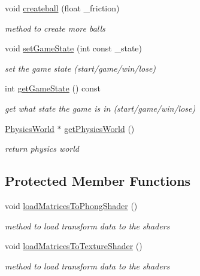\begin{DoxyCompactItemize}
void \hyperlink{classNGLDraw_a11a65720f14b3b58173c23daf8013e7c}{createball} (float \_\-friction)
\begin{DoxyCompactList}\small\item\em method to create more balls \item\end{DoxyCompactList}\item 
void \hyperlink{classNGLDraw_a79b107d9d00406530f7693159c6afdad}{setGameState} (int const \_\-state)
\begin{DoxyCompactList}\small\item\em set the game state (start/game/win/lose) \item\end{DoxyCompactList}\item 
int \hyperlink{classNGLDraw_a3f6d511c845e8855366d3007c73a8162}{getGameState} () const 
\begin{DoxyCompactList}\small\item\em get what state the game is in (start/game/win/lose) \item\end{DoxyCompactList}\item 
\hypertarget{classNGLDraw_ad73f75d8409c2a4f057dda554c3a5a18}{
\hyperlink{classPhysicsWorld}{PhysicsWorld} $\ast$ \hyperlink{classNGLDraw_ad73f75d8409c2a4f057dda554c3a5a18}{getPhysicsWorld} ()}
\label{classNGLDraw_ad73f75d8409c2a4f057dda554c3a5a18}

\begin{DoxyCompactList}\small\item\em return physics world \item\end{DoxyCompactList}\end{DoxyCompactItemize}
\subsection*{Protected Member Functions}
\begin{DoxyCompactItemize}
\item 
\hypertarget{classNGLDraw_a60d347a21f883b1ef137bb8f823bc44c}{
void \hyperlink{classNGLDraw_a60d347a21f883b1ef137bb8f823bc44c}{loadMatricesToPhongShader} ()}
\label{classNGLDraw_a60d347a21f883b1ef137bb8f823bc44c}

\begin{DoxyCompactList}\small\item\em method to load transform data to the shaders \item\end{DoxyCompactList}\item 
\hypertarget{classNGLDraw_ad1fb1942df0b726c6e6305a2d42b975e}{
void \hyperlink{classNGLDraw_ad1fb1942df0b726c6e6305a2d42b975e}{loadMatricesToTextureShader} ()}
\label{classNGLDraw_ad1fb1942df0b726c6e6305a2d42b975e}

\begin{DoxyCompactList}\small\item\em method to load transform data to the shaders \item\end{DoxyCompactList}\end{DoxyCompactItemize}
